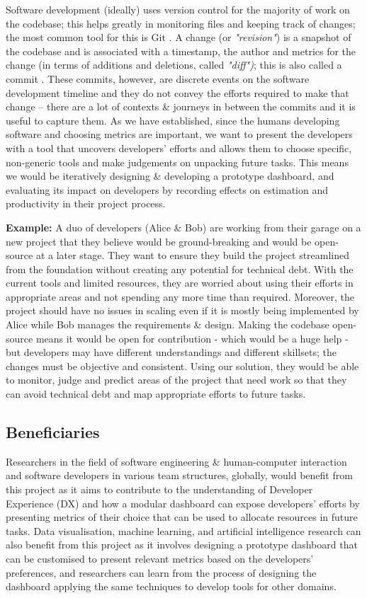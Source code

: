 \documentclass{prrcs}
\begin{document}
Software development (ideally) uses version control for the majority of work on the codebase; this helps greatly in monitoring files and keeping track of changes; the most common tool for this is Git \cite{Git,loeligerVersionControlGit2012}. A change (or \textit{"revision"}) is a snapshot of the codebase and is associated with a timestamp, the author and metrics for the change (in terms of additions and deletions, called \textit{"diff")}; this is also called a commit \cite{wingerdPracticalPerforce2005}. These commits, however, are discrete events on the software development timeline and they do not convey the efforts required to make that change -- there are a lot of contexts \& journeys in between the commits and it is useful to capture them. As we have established, since the humans developing software and choosing metrics are important, we want to present the developers with a tool that uncovers developers' efforts and allows them to choose specific, non-generic tools and make judgements on unpacking future tasks. This means we would be iteratively designing \& developing a prototype dashboard, and evaluating its impact on developers by recording effects on estimation and productivity in their project process.

\textbf{Example:} A duo of developers (Alice \& Bob) are working from their garage on a new project that they believe would be ground-breaking and would be open-source at a later stage. They want to ensure they build the project streamlined from the foundation without creating any potential for technical debt. With the current tools and limited resources, they are worried about using their efforts in appropriate areas and not spending any more time than required. Moreover, the project should have no issues in scaling even if it is mostly being implemented by Alice while Bob manages the requirements \& design. Making the codebase open-source means it would be open for contribution - which would be a huge help - but developers may have different understandings and different skillsets; the changes must be objective and consistent. Using our solution, they would be able to monitor, judge and predict areas of the project that need work so that they can avoid technical debt and map appropriate efforts to future tasks.

\subsection*{Beneficiaries}

Researchers in the field of software engineering \& human-computer interaction and software developers in various team structures, globally, would benefit from this project as it aims to contribute to the understanding of Developer Experience (DX) and how a modular dashboard can expose developers' efforts by presenting metrics of their choice that can be used to allocate resources in future tasks. Data visualisation, machine learning, and artificial intelligence research can also benefit from this project as it involves designing a prototype dashboard that can be customised to present relevant metrics based on the developers' preferences, and researchers can learn from the process of designing the dashboard applying the same techniques to develop tools for other domains.
\end{document}
